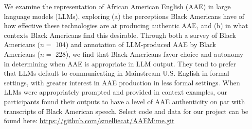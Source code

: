 We examine the representation of African American English (AAE) in large language models (LLMs), exploring (a) the perceptions Black Americans have of how effective these technologies are at producing authentic AAE, and (b) in what contexts Black Americans find this desirable.
Through both a survey of Black Americans ($n=$ 104) and annotation of LLM-produced AAE by Black Americans ($n=$ 228), we find that Black Americans favor choice and autonomy in determining when AAE is appropriate in LLM output. They tend to prefer that LLMs default to communicating in Mainstream U.S. English in formal settings, with greater interest in AAE production in less formal settings. When LLMs were appropriately prompted and provided in context examples, our participants found their outputs to have a level of AAE authenticity on par with transcripts of Black American speech. Select code and data for our project can be found here: \url{https://github.com/smelliecat/AAEMime.git} %

